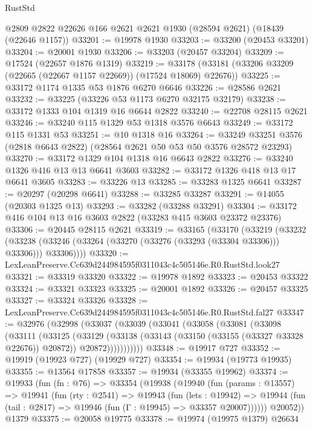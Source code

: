 \begin{lexlean}{RustStd}
\begin{coremodule}
    @2809
    @2822
    @22626
    @166
    @2621
    @2621
    @1930
    (@28594 @2621)
    (@18439 (@22646 @1157))
@33201 := @19978 @1930
@33203 := @33200 (@20453 @33201)
@33204 := @20001 @1930
@33206 := @33203 (@20457 @33204)
@33209 := @17524 (@22657 @1876 @1319)
@33219 := @33178 (@33181 (@33206 @33209 (@22665 (@22667 @1157 @22669)) (@17524 @18069) @22676))
@33225 := @33172 @1174 @1335 @53 @1876 @6270 @6646
@33226 := @28586 @2621
@33232 := @33225 (@33226 @53 @1173 @6270 @32175 @32179)
@33238 := @33172 @1333 @104 @1319 @16 @6644 @2822
@33240 := @22708 @28115 @2621
@33246 := @33240 @115 @1329 @53 @1318 @3576 @6643
@33249 := @33172 @115 @1331 @53
@33251 := @10 @1318 @16
@33264 := @33249 @33251 @3576 (@2818 @6643 @2822) (@28564 @2621 @50 @53 @50 @3576 @28572 @23293)
@33270 := @33172 @1329 @104 @1318 @16 @6643 @2822
@33276 := @33240 @1326 @416 @13 @13 @6641 @3603
@33282 := @33172 @1326 @418 @13 @17 @6641 @3605
@33283 := @33226 @13
@33285 := @33283 @1325 @6641
@33287 := @20297 (@20298 @6641)
@33288 := @33285 @33287
@33291 := @14055 (@20303 @1325 @13)
@33293 := @33282 (@33288 @33291)
@33304 := @33172 @416 @104 @13 @16 @3603 @2822 (@33283 @415 @3603 @23372 @23376)
@33306 := @20445 @28115 @2621
@33319 := @33165
    (@33170
      (@33219
        (@33232
          (@33238 (@33246 (@33264 (@33270 (@33276 (@33293 (@33304 @33306))) @33306))) @33306))))
@33320 := LexLeanPreserve.Cc639d244984595f0311043c4c505146e.R0.RustStd.look27
@33321 := @33319 @33320
@33322 := @19978 @1892
@33323 := @20453 @33322
@33324 := @33321 @33323
@33325 := @20001 @1892
@33326 := @20457 @33325
@33327 := @33324 @33326
@33328 := LexLeanPreserve.Cc639d244984595f0311043c4c505146e.R0.RustStd.fal27
@33347 := @32976
    (@32998
      (@33037
        (@33039
          (@33041
            (@33058
              (@33081
                (@33098
                  (@33111
                    (@33125
                      (@33129
                        (@33138
                          (@33143 (@33150 (@33155 (@33327 @33328 @22676)) @20872))
                          @20872)))))))))))
@33348 := @19917 @727
@33352 := @19919 (@19923 @727) (@19929 @727)
@33354 := @19934 (@19773 @19935)
@33355 := @13564 @17858
@33357 := @19934 (@33355 @19962)
@33374 := @19933
    (fun (fn : @76) =>
    @33354
      (@19938
        (@19940
          (fun (params : @13557) =>
          @19941
            (fun (rty : @2541) =>
            @19943
              (fun (lets : @19942) =>
              @19944 (fun (tail : @2817) => @19946 (fun (Γ : @19945) => @33357 @20007))))))
        @20052))
    @1379
@33375 := @20058 @19775
@33378 := @19974 (@19975 @1379) @26634

\end{coremodule}
\end{lexlean}

